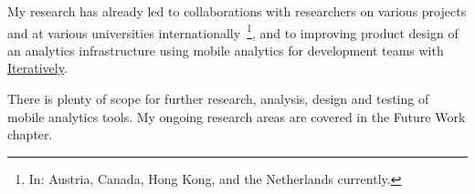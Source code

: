 My research has already led to collaborations with researchers on various projects and at various universities internationally~\footnote{In: Austria, Canada, Hong Kong, and the Netherlands currently.}, and to improving product design of an analytics infrastructure using mobile analytics for development teams with \href{https://iterative.ly/}{Iteratively}. 

There is plenty of scope for further research, analysis, design and testing of mobile analytics tools. My ongoing research areas are covered in the Future Work chapter.



